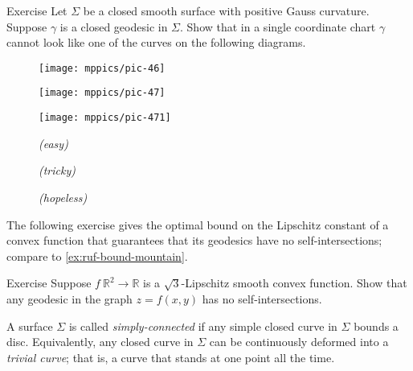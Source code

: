 \begin{thm}{Exercise}\label{ex:self-intersections}
Let $\Sigma$ be a closed smooth surface with positive Gauss curvature. 
Suppose $\gamma$ is a closed geodesic in $\Sigma$.
Show that in a single coordinate chart $\gamma$ cannot look like one of the curves on the following diagrams.

\begin{figure}[h]
\begin{minipage}{.32\textwidth}
\centering
\texttt{[image: mppics/pic-46]}
\end{minipage}
\hfill
\begin{minipage}{.32\textwidth}
\centering
\texttt{[image: mppics/pic-47]}
\end{minipage}
\hfill
\begin{minipage}{.32\textwidth}
\centering
\texttt{[image: mppics/pic-471]}
\end{minipage}

\medskip

\begin{minipage}{.32\textwidth}
\centering
\caption*{\textit{(easy)}}
\end{minipage}
\hfill
\begin{minipage}{.32\textwidth}
\centering
\caption*{\textit{(tricky)}}
\end{minipage}
\hfill
\begin{minipage}{.32\textwidth}
\centering
\caption*{\textit{(hopeless)}}
\end{minipage}
\end{figure}

\end{thm}


The following exercise gives the optimal bound on the Lipschitz constant of a convex function that guarantees that its geodesics have no self-intersections;
compare to \ref{ex:ruf-bound-mountain}.

\begin{thm}{Exercise}\label{ex:sqrt(3)}
Suppose $f\:\mathbb{R}^2\to\mathbb{R}$ is a $\sqrt{3}$-Lipschitz smooth convex function.
Show that any geodesic in the graph $z=f(x,y)$ has no self-intersections.
\end{thm}

A surface $\Sigma$ is called \emph{simply-connected} if any simple closed curve in $\Sigma$ bounds a disc.
Equivalently, any closed curve in $\Sigma$ can be continuously deformed into a \emph{trivial curve}; that is, a curve that stands at one point all the time.

